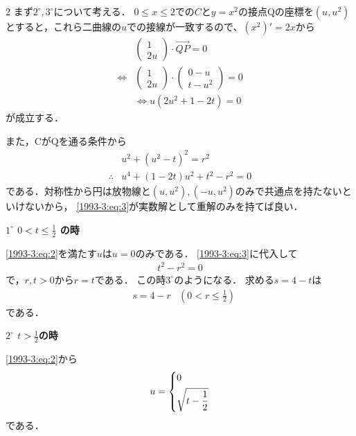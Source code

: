 \documentclass[../../../../main.tex]{subfiles}
\begin{document}
\begin{multicols}{2}
  まず$2^{\circ}, 3^{\circ}$について考える．
  $0\le x \le 2$での$C$と$y=x^2$の接点Qの座標を$(u,u^2)$とすると，これら二曲線の$u$での接線が一致するので、$(x^2)'=2x$から
  \begin{align}
     & \begin{pmatrix} 1 \\ 2u \end{pmatrix} \cdot \vec{QP} = 0                                   \\
    \Leftrightarrow
     & \begin{pmatrix} 1 \\ 2u \end{pmatrix} \cdot \begin{pmatrix} 0-u \\ t-u^2 \end{pmatrix} = 0 \\
     & \Leftrightarrow
    u(2u^2+1-2t) = 0 \label{1993-3:eq:2}
  \end{align}
  が成立する．

  また，CがQを通る条件から
  \begin{align}
     & u^2+(u^2-t)^2=r^2                            \\
    \therefore
     & u^4+(1-2t)u^2+t^2-r^2=0  \label{1993-3:eq:3}
  \end{align}
  である．対称性から円は放物線と$(u,u^2), (-u,u^2)$のみで共通点を持たないといけないから，
  \cref{1993-3:eq:3}が実数解として重解のみを持てば良い．

  \vspace{5pt}
  \textbf{$1^{\circ}$ $0<t \le \frac{1}{2}$ の時}

  \cref{1993-3:eq:2}を満たす$u$は$u=0$のみである．
  \cref{1993-3:eq:3}に代入して
  \begin{align*}
    t^2-r^2 = 0
  \end{align*}
  で，$r,t>0$から$r=t$である．
  この時$3^{\circ}$のようになる．
  求める$s=4-t$は
  \begin{align}
     & s = 4 -r & \left(0 < r \le \frac{1}{2}\right)\label{1993-3:eq:4}
  \end{align}
  である．

  \vspace{5pt}
  \textbf{$2^{\circ}$ $t>\frac{1}{2}$の時}

  \cref{1993-3:eq:2}から
  \begin{align*}
    u =
    \begin{dcases}
      0 \\
      \sqrt{t-\frac{1}{2}}
    \end{dcases}
  \end{align*}
  である．


\end{multicols}
\end{document}
